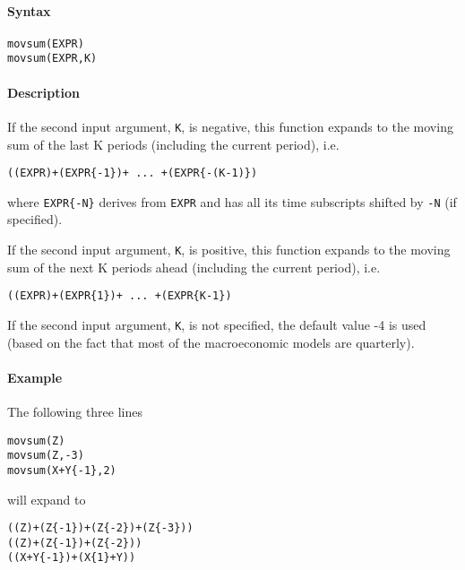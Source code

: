 


	\paragraph{Syntax}\label{syntax}

\begin{verbatim}
movsum(EXPR)
movsum(EXPR,K)
\end{verbatim}

\paragraph{Description}\label{description}

If the second input argument, \texttt{K}, is negative, this function
expands to the moving sum of the last K periods (including the current
period), i.e.

\begin{verbatim}
((EXPR)+(EXPR{-1})+ ... +(EXPR{-(K-1)})
\end{verbatim}

where \texttt{EXPR\{-N\}} derives from \texttt{EXPR} and has all its
time subscripts shifted by \texttt{-N} (if specified).

If the second input argument, \texttt{K}, is positive, this function
expands to the moving sum of the next K periods ahead (including the
current period), i.e.

\begin{verbatim}
((EXPR)+(EXPR{1})+ ... +(EXPR{K-1})
\end{verbatim}

If the second input argument, \texttt{K}, is not specified, the default
value -4 is used (based on the fact that most of the macroeconomic
models are quarterly).

\paragraph{Example}\label{example}

The following three lines

\begin{verbatim}
movsum(Z)
movsum(Z,-3)
movsum(X+Y{-1},2)
\end{verbatim}

will expand to

\begin{verbatim}
((Z)+(Z{-1})+(Z{-2})+(Z{-3}))
((Z)+(Z{-1})+(Z{-2}))
((X+Y{-1})+(X{1}+Y))
\end{verbatim}


